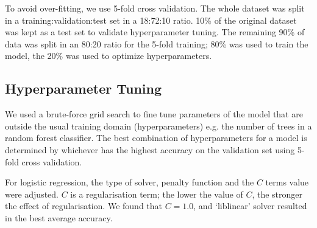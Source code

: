 To avoid over-fitting, we use 5-fold cross validation. The whole dataset was split in a training:validation:test set in a 18:72:10 ratio. 10\% of the original dataset was kept as a test set to validate hyperparameter tuning. The remaining 90\% of data was split in an 80:20 ratio for the 5-fold training; 80\% was used to train the model, the 20\% was used to optimize hyperparameters. %

\subsection{Hyperparameter Tuning} \label{hpt}
We used a brute-force grid search to fine tune parameters of the model that are outside the usual training domain (hyperparameters) e.g. the number of trees in a random forest classifier.
The best combination of hyperparameters for a model is determined by whichever has the highest accuracy on the validation set using 5-fold cross validation.

For logistic regression, the type of solver, penalty function and the $C$  terms value were adjusted. $C$ is a regularisation term; 
the lower the value of $C$, the stronger the effect of regularisation. We found that  $C=1.0$, and `liblinear' solver resulted in the best average accuracy.

